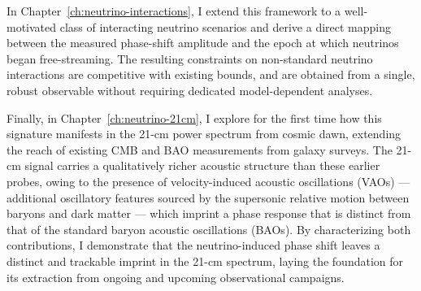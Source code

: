 In Chapter~\ref{ch:neutrino-interactions}, I extend this framework to a well-motivated class of interacting neutrino scenarios and derive a direct mapping between the measured phase-shift amplitude and the epoch at which neutrinos began free-streaming. The resulting constraints on non-standard neutrino interactions are competitive with existing bounds, and are obtained from a single, robust observable without requiring dedicated model-dependent analyses.


Finally, in Chapter~\ref{ch:neutrino-21cm}, I explore for the first time how this signature manifests in the 21-cm power spectrum from cosmic dawn, extending the reach of existing CMB and BAO measurements from galaxy surveys. The 21-cm signal carries a qualitatively richer acoustic structure than these earlier probes, owing to the presence of velocity-induced acoustic oscillations (VAOs) --- additional oscillatory features sourced by the supersonic relative motion between baryons and dark matter --- which imprint a phase response that is distinct from that of the standard baryon acoustic oscillations (BAOs). By characterizing both contributions, I demonstrate that the neutrino-induced phase shift leaves a distinct and trackable imprint in the 21-cm spectrum, laying the foundation for its extraction from ongoing and upcoming observational campaigns.
